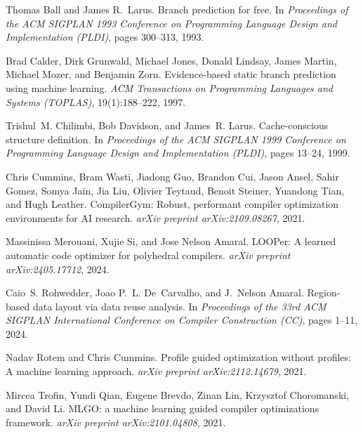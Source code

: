 \documentclass{article}
\begin{document}
\begin{small}

Thomas Ball and James R.~Larus.
\newblock Branch prediction for free.
\newblock In \emph{Proceedings of the ACM SIGPLAN 1993 Conference on Programming Language Design and Implementation (PLDI)}, pages 300--313, 1993.

Brad Calder, Dirk Grunwald, Michael Jones, Donald Lindsay, James Martin, Michael Mozer, and Benjamin Zorn.
\newblock Evidence-based static branch prediction using machine learning.
\newblock \emph{ACM Transactions on Programming Languages and Systems (TOPLAS)}, 19(1):188--222, 1997.

Trishul~M. Chilimbi, Bob Davidson, and James~R. Larus.
\newblock Cache-conscious structure definition.
\newblock In \emph{Proceedings of the ACM SIGPLAN 1999 Conference on Programming Language Design and Implementation (PLDI)}, pages 13--24, 1999.

Chris Cummins, Bram Wasti, Jiadong Guo, Brandon Cui, Jason Ansel, Sahir Gomez, Somya Jain, Jia Liu, Olivier Teytaud, Benoit Steiner, Yuandong Tian, and Hugh Leather.
\newblock CompilerGym: Robust, performant compiler optimization environments for AI research.
\newblock \emph{arXiv preprint arXiv:2109.08267}, 2021.

Massinissa Merouani, Xujie Si, and Jose Nelson Amaral.
\newblock LOOPer: A learned automatic code optimizer for polyhedral compilers.
\newblock \emph{arXiv preprint arXiv:2405.17712}, 2024.

Caio~S. Rohwedder, Joao P.~L. De~Carvalho, and J.~Nelson Amaral.
\newblock Region-based data layout via data reuse analysis.
\newblock In \emph{Proceedings of the 33rd ACM SIGPLAN International Conference on Compiler Construction (CC)}, pages 1--11, 2024.

Nadav Rotem and Chris Cummins.
\newblock Profile guided optimization without profiles: A machine learning approach.
\newblock \emph{arXiv preprint arXiv:2112.14679}, 2021.

Mircea Trofin, Yundi Qian, Eugene Brevdo, Zinan Lin, Krzysztof Choromanski, and David Li.
\newblock MLGO: a machine learning guided compiler optimizations framework.
\newblock \emph{arXiv preprint arXiv:2101.04808}, 2021.


\end{small}
\end{document}
